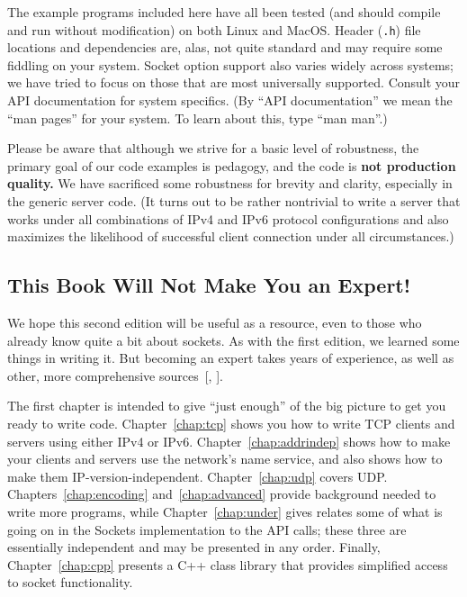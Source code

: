 The example programs included here have all been tested (and
should compile and run without modification) on both Linux and
MacOS.
Header (\texttt{.h}) file locations and dependencies are, alas, not quite
standard and may require some fiddling on your system. Socket option
support also varies widely across systems; we have tried to focus on
those that are most universally supported.  Consult your API
documentation for system specifics.  (By ``API documentation'' we mean
the ``man pages'' for your system.  To learn about this, type ``man man''.)

Please be aware that although we strive for a basic level of
robustness, the primary goal of our
code examples is pedagogy, and the code is \textbf{not production
quality.}  We have sacrificed some robustness for brevity and clarity,
especially in the generic server code.  (It turns out to be rather
nontrivial to write a server that works under all combinations
of IPv4 and IPv6 protocol configurations and also maximizes the
likelihood of successful client connection under all circumstances.)

\subsection*{This Book Will Not Make You an Expert!}

We hope this
second edition will be useful as a resource, even to those who already
know quite a bit about sockets.
As with the first edition, we learned some things in writing it.
But becoming an expert
takes years of experience, as well as other, more comprehensive
sources~[\cite{ComerV3}, \cite{StevensUNP}]. 


The first chapter is intended to give ``just enough'' of the big
picture to get you ready to write code.  Chapter~\ref{chap:tcp}
shows you how to write TCP clients and servers using either IPv4 or IPv6.
Chapter~\ref{chap:addrindep} shows how to make your clients and
servers use the network's name service, and also shows how to make
them IP-version-independent.  Chapter~\ref{chap:udp} covers UDP.
Chapters~\ref{chap:encoding} and~\ref{chap:advanced} provide
background needed to write more programs, while
Chapter~\ref{chap:under} gives relates some of what is going on in the
Sockets implementation to the API calls; these three are essentially
independent and may be presented in any order.
Finally, Chapter~\ref{chap:cpp} presents a C++ class library that
provides simplified access to socket functionality.

